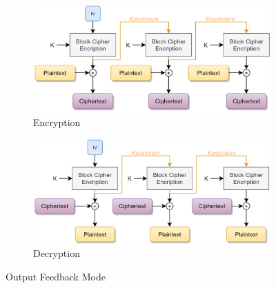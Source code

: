 \begin{figure}[h]
    \centering
    \begin{subfigure}[b]{0.48\textwidth}
    \includegraphics[width=\textwidth]{image/ofbenc.png}
    \caption{Encryption}
    \label{fig:ofbenc}
    \end{subfigure}\quad
    \begin{subfigure}[b]{0.48\textwidth}
    \includegraphics[width=\textwidth]{image/ofbdec.png}
    \caption{Decryption}
    \label{fig:ofbdec}
    \end{subfigure}
    \caption{Output Feedback Mode}
\end{figure}
